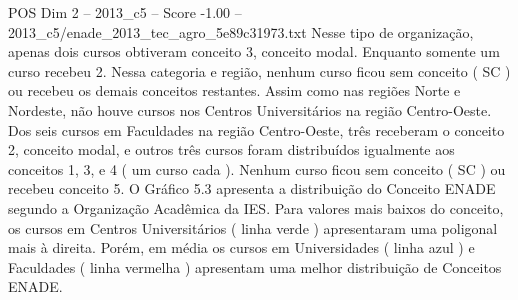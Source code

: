 \begin{textsample}{POS Dim 2 – 2013\_c5 – Score -1.00 – 2013\_c5/enade\_2013\_tec\_agro\_5e89c31973.txt}
Nesse tipo de organização, apenas dois cursos obtiveram conceito 3, conceito modal.
Enquanto somente um curso recebeu 2.
Nessa categoria e região, nenhum curso ficou sem conceito ( SC ) ou recebeu os demais conceitos restantes.
Assim como nas regiões Norte e Nordeste, não houve cursos nos Centros Universitários na região Centro-Oeste.
Dos seis cursos em Faculdades na região Centro-Oeste, três receberam o conceito 2, conceito modal, e outros três cursos foram distribuídos igualmente aos conceitos 1, 3, e 4 ( um curso cada ).
Nenhum curso ficou sem conceito ( SC ) ou recebeu conceito 5.
O Gráfico 5.3 apresenta a distribuição do Conceito ENADE segundo a Organização Acadêmica da IES.
Para valores mais baixos do conceito, os cursos em Centros Universitários ( linha verde ) apresentaram uma poligonal mais à direita.
Porém, em média os cursos em Universidades ( linha azul ) e Faculdades ( linha vermelha ) apresentam uma melhor distribuição de Conceitos ENADE.

\end{textsample}

